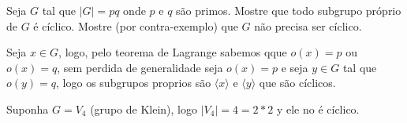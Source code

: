 \begin{homeworkProblem}
  Seja $G$ tal que $|G| = pq$ onde $p$ e $q$ são primos. Mostre que todo subgrupo próprio de $G$ é cíclico. Mostre (por contra-exemplo) que $G$ não precisa ser cíclico.
  \begin{solution}
    Seja $x\in G$, logo, pelo teorema de Lagrange sabemos qque $o(x)=p$ ou $o(x)=q$, sem perdida de generalidade seja $o(x)=p$ e seja $y\in G$ tal que $o(y)=q$, logo os subgrupos proprios são $\langle x \rangle$ e $\langle y \rangle$ que são cíclicos.

    Suponha $G=V_4$ (grupo de Klein), logo $|V_4|=4=2*2$ y ele no é cíclico. 
  \end{solution}
\end{homeworkProblem}
